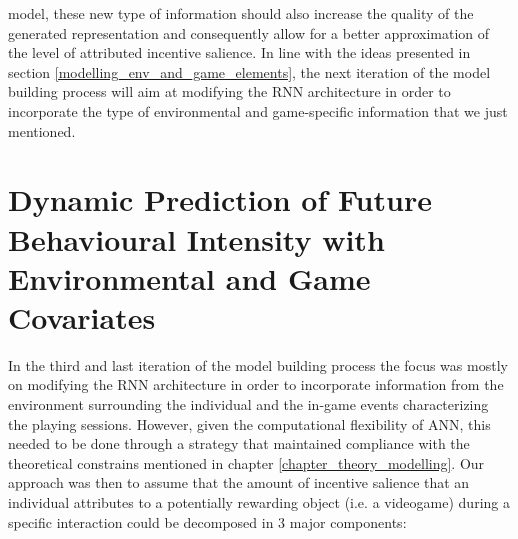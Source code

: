 model, these new type of information should also increase the quality of the generated representation and consequently allow for a better approximation of the level of attributed incentive salience. In line with the ideas presented in section \ref{modelling_env_and_game_elements}, the next iteration of the model building process will aim at modifying the RNN architecture in order to incorporate the type of environmental and game-specific information that we just mentioned.

\section{Dynamic Prediction of Future Behavioural Intensity with Environmental and Game Covariates}
\label{model_architecture_3}
In the third and last iteration of the model building process the focus was mostly on modifying the RNN architecture in order to incorporate information from the environment surrounding the individual and the in-game events characterizing the playing sessions. However, given the computational flexibility of ANN, this needed to be done through a strategy that maintained compliance with the theoretical constrains mentioned in chapter \ref{chapter_theory_modelling}. Our approach was then to assume that the amount of incentive salience that an individual attributes to a potentially rewarding object (i.e. a videogame) during a specific interaction could be decomposed in 3 major components:
